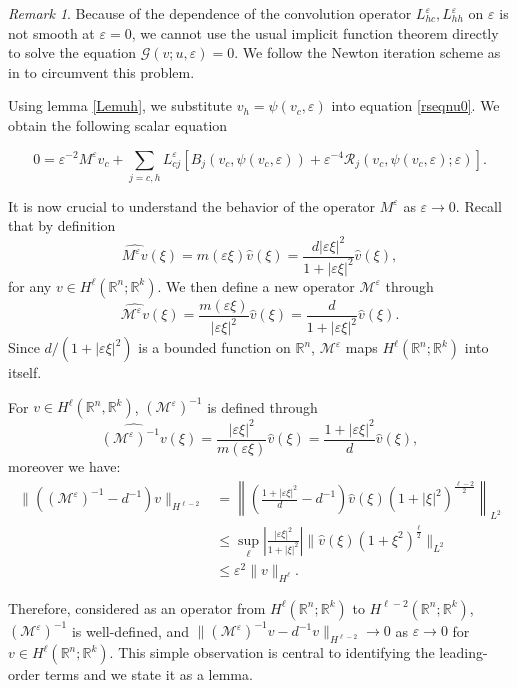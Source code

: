 \documentclass[letterpaper,11pt]{article}
\newcommand{\R}{\mathbb{R}}
\newcommand{\eps}{\varepsilon}
\newcommand{\Rm}{\mathcal{R}}
\newcommand{\G}{\mathcal{G}}
\newcommand{\M}{\mathcal{M}}
\numberwithin{equation}{section}
\theoremstyle{plain}
\theoremstyle{remark}
\newtheorem*{remark}{Remark}
\begin{document}
\begin{remark} Because of the dependence of the convolution operator $L_{hc}^\eps, L_{hh}^\eps$ on $\eps$ is not smooth at $\eps = 0$, we cannot use the usual implicit function theorem directly to solve the equation $\G(v;u,\eps) = 0$. We follow the Newton iteration scheme as in \citep{faye2013existence} to circumvent this problem.
\end{remark}

Using lemma \ref{Lemuh}, we substitute $v_h = \psi(v_c,\eps)$ into equation \eqref{rseqnu0}. We obtain the following scalar equation

\begin{equation} \label{1dnl}
0 = \eps^{-2}M^\eps v_c + \sum_{j=c,h}L_{cj}^\eps\left[B_j(v_c,\psi(v_c,\eps))+\eps^{-4}\Rm_j(v_c,\psi(v_c,\eps);\eps)\right].
\end{equation}


It is now crucial to understand the behavior of the operator $M^\eps$ as $\eps \to 0$. Recall that by definition
\[
\widehat{M^\eps v}(\xi) = m(\eps \xi)\widehat{v}(\xi) = \frac{d|\eps\xi|^2}{1+|\eps\xi|^2} \widehat{v}(\xi), 
\]
for any $v\in H^\ell(\R^n;\R^k)$. We then define a new operator $\mathcal{M}^\eps$ through 
\[ 
\widehat{\mathcal{M}^\eps v}(\xi) = \frac{m(\eps\xi)}{|\eps\xi|^2}\widehat{v}(\xi)=\frac{d}{1+|\eps\xi|^2} \widehat{v}(\xi). 
\] 
Since $d/(1+|\eps \xi|^2)$ is a bounded function on $\R^n$, $\M^\eps$ maps $H^\ell(\R^n;\R^k)$ into itself. 

For $v\in H^\ell(\R^n,\R^k)$, $(\M^{\eps})^{-1}$ is defined through
\[
\widehat{(\M^{\eps})^{-1}v} (\xi) = \frac{|\eps\xi|^2}{m(\eps\xi)} \widehat{v}(\xi)= \frac{1+|\eps \xi|^2}{d} \widehat{v}(\xi),
\]
moreover we have:
\begin{align*}
\|((\M^\eps)^{-1}-d^{-1})v\|_{H^{\ell-2}} &=\left\| \left(\frac{1+|\eps\xi|^2}{d}-d^{-1}\right)\widehat{v}(\xi)(1+|\xi|^2)^{\frac{\ell-2}{2}}\right\|_{L^2} 
\\
& \le \sup_{\ell} \left|\frac{|\eps\xi|^2}{1+|\xi|^2}\right| \|\widehat{v}(\xi)(1+\xi^2)^{\frac{\ell}{2}} \|_{L^{2}}\\ 
&\le \eps^2 \|v\|_{H^\ell}.
\end{align*}

Therefore, considered as an operator from $H^\ell (\R^n;\R^k)$ to $H^{\ell-2}(\R^n;\R^k)$, $(\M^\eps)^{-1}$ is well-defined, and $\|(\M^{\eps})^{-1}v - d^{-1}v\|_{H^{\ell-2}} \to 0$ as $\eps \to 0$ for $v \in H^\ell (\R^n;\R^k)$. This simple observation is central to identifying the leading-order terms and  we state it as a lemma.
\end{document}
